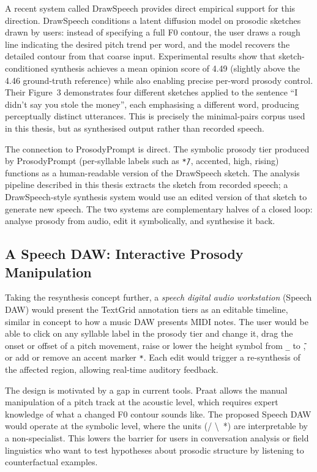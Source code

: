 A recent system called DrawSpeech \cite{chen2025drawspeech} provides
direct empirical support for this direction. DrawSpeech conditions a
latent diffusion model on prosodic sketches drawn by users: instead of
specifying a full F0 contour, the user draws a rough line indicating the
desired pitch trend per word, and the model recovers the detailed contour
from that coarse input. Experimental results show that sketch-conditioned
synthesis achieves a mean opinion score of 4.49 (slightly above the
4.46 ground-truth reference) while also enabling precise per-word
prosody control. Their Figure~3 demonstrates four different sketches
applied to the sentence ``I didn't say you stole the money'', each
emphasising a different word, producing perceptually distinct utterances.
This is precisely the minimal-pairs corpus used in this thesis, but as
synthesised output rather than recorded speech.

The connection to ProsodyPrompt is direct. The symbolic prosody tier
produced by ProsodyPrompt (per-syllable labels such as
\texttt{*{\={}}/}, accented, high, rising) functions as a
human-readable version of the DrawSpeech sketch. The analysis pipeline
described in this thesis extracts the sketch from recorded speech; a
DrawSpeech-style synthesis system would use an edited version of that
sketch to generate new speech. The two systems are complementary halves
of a closed loop: analyse prosody from audio, edit it symbolically, and
synthesise it back.

\subsection{A Speech DAW: Interactive Prosody Manipulation}
\label{sec:speech_daw}

Taking the resynthesis concept further, a \emph{speech digital audio workstation}
(Speech DAW) would present the TextGrid annotation tiers as an editable timeline,
similar in concept to how a music DAW presents MIDI notes. The user would be able
to click on any syllable label in the prosody tier and change it, drag the onset
or offset of a pitch movement, raise or lower the height symbol from \texttt{\_}
to \texttt{{\={}}}, or add or remove an accent marker \texttt{*}. Each edit would
trigger a re-synthesis of the affected region, allowing real-time auditory
feedback.

The design is motivated by a gap in current tools. Praat allows the manual
manipulation of a pitch track at the acoustic level, which requires expert
knowledge of what a changed F0 contour sounds like. The proposed Speech DAW
would operate at the symbolic level, where the units (/ \textbackslash\, *) are
interpretable by a non-specialist. This lowers the barrier for users in
conversation analysis or field linguistics who want to test hypotheses about
prosodic structure by listening to counterfactual examples.

